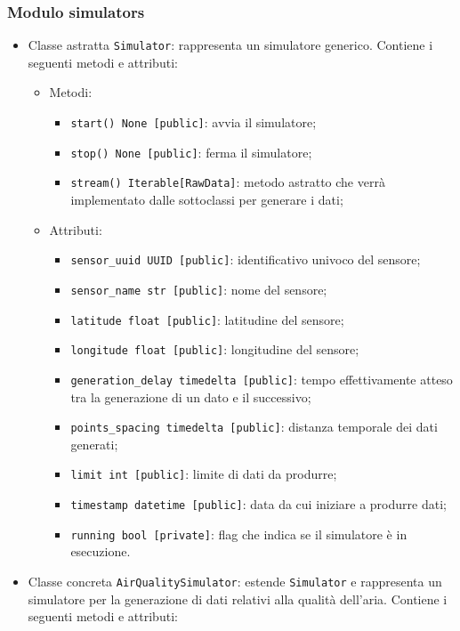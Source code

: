 \subsubsection{Modulo simulators}
\begin{itemize}
    \item Classe astratta \texttt{Simulator}: rappresenta un simulatore generico. Contiene i seguenti metodi e attributi:
    \begin{itemize}
        \item Metodi:
        \begin{itemize}
            \item \texttt{start() None [public]}: avvia il simulatore;
            \item \texttt{stop() None [public]}: ferma il simulatore;
            \item \texttt{stream() Iterable[RawData]}: metodo astratto che verrà implementato dalle sottoclassi per generare i dati;
        \end{itemize}
        \item Attributi:
        \begin{itemize}
            \item \texttt{sensor\_uuid UUID [public]}: identificativo univoco del sensore;
            \item \texttt{sensor\_name str [public]}: nome del sensore;
            \item \texttt{latitude float [public]}: latitudine del sensore;
            \item \texttt{longitude float [public]}: longitudine del sensore;
            \item \texttt{generation\_delay timedelta [public]}: tempo effettivamente atteso tra la generazione di un dato e il successivo;
            \item \texttt{points\_spacing timedelta [public]}: distanza temporale dei dati generati;
            \item \texttt{limit int [public]}: limite di dati da produrre;
            \item \texttt{timestamp datetime [public]}: data da cui iniziare a produrre dati;
            \item \texttt{running bool [private]}: flag che indica se il simulatore è in esecuzione.
        \end{itemize}
    \end{itemize}
    \item Classe concreta \texttt{AirQualitySimulator}: estende \texttt{Simulator} e rappresenta un simulatore per la generazione di dati relativi alla qualità dell'aria. Contiene i seguenti metodi e attributi:

\end{itemize}
